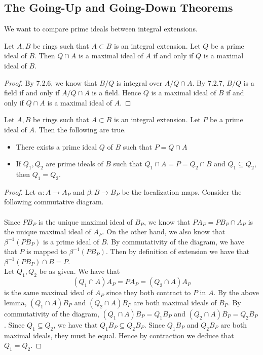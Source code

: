 \documentclass[a4paper]{article}
\begin{document}
\subsection{The Going-Up and Going-Down Theorems}
We want to compare prime ideals between integral extensions. 

\begin{lmm}{}{} Let $A,B$ be rings such that $A\subset B$ is an integral extension. Let $Q$ be a prime ideal of $B$. Then $Q\cap A$ is a maximal ideal of $A$ if and only if $Q$ is a maximal ideal of $B$. 
\begin{proof}
By 7.2.6, we know that $B/Q$ is integral over $A/Q\cap A$. By 7.2.7, $B/Q$ is a field if and only if $A/Q\cap A$ is a field. Hence $Q$ is a maximal ideal of $B$ if and only if $Q\cap A$ is a maximal ideal of $A$. 
\end{proof}
\end{lmm}

\begin{prp}{}{} Let $A,B$ be rings such that $A\subset B$ is an integral extension. Let $P$ be a prime ideal of $A$. Then the following are true. 
\begin{itemize}
\item There exists a prime ideal $Q$ of $B$ such that $P=Q\cap A$
\item If $Q_1,Q_2$ are prime ideals of $B$ such that $Q_1\cap A=P=Q_2\cap B$ and $Q_1\subseteq Q_2$, then $Q_1=Q_2$. 
\end{itemize} 
\begin{proof}
Let $\alpha:A\to A_P$ and $\beta:B\to B_P$ be the localization maps. Consider the following commutative diagram. \\
\\
Since $PB_P$ is the unique maximal ideal of $B_P$, we know that $PA_P=PB_P\cap A_P$ is the unique maximal ideal of $A_P$. On the other hand, we also know that $\beta^{-1}(PB_P)$ is a prime ideal of $B$. By commutativity of the diagram, we have that $P$ is mapped to $\beta^{-1}(PB_P)$. Then by definition of extension we have that $\beta^{-1}(PB_P)\cap B=P$. \\

Let $Q_1,Q_2$ be as given. We have that $$(Q_1\cap A)A_P=PA_P=(Q_2\cap A)A_P$$ is the same maximal ideal of $A_P$ since they both contract to $P$ in $A$. By the above lemma, $(Q_1\cap A)B_P$ and $(Q_2\cap A)B_P$ are both maximal ideals of $B_P$. By commutativity of the diagram, $(Q_1\cap A)B_P=Q_1B_P$ and $(Q_2\cap A)B_P=Q_2B_P$. Since $Q_1\subseteq Q_2$, we have that $Q_1B_P\subseteq Q_2B_P$. Since $Q_1B_P$ and $Q_2B_P$ are both maximal ideals, they must be equal. Hence by contraction we deduce that $Q_1=Q_2$. 
\end{proof}
\end{prp}
\end{document}
